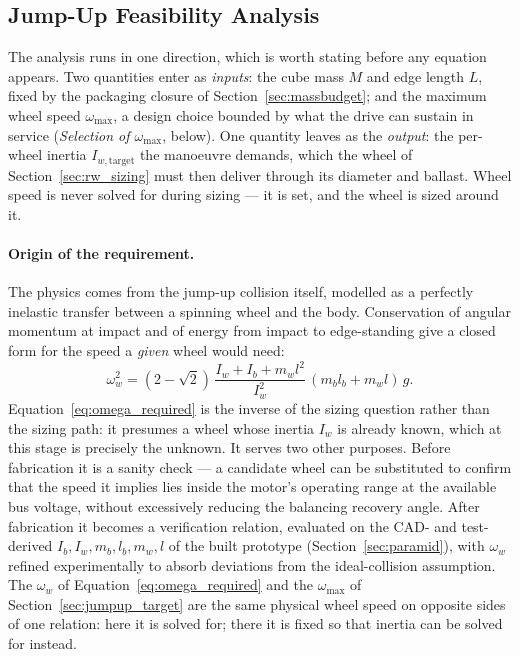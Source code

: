 \subsection{Jump-Up Feasibility Analysis}
\label{sec:jumpup}

The analysis runs in one direction, which is worth stating before any equation
appears. Two quantities enter as \emph{inputs}: the cube mass $M$ and edge
length $L$, fixed by the packaging closure of Section~\ref{sec:massbudget};
and the maximum wheel speed $\omega_{\max}$, a design choice bounded by what
the drive can sustain in service (\emph{Selection of $\omega_{\max}$}, below).
One quantity leaves as the \emph{output}: the per-wheel inertia
$I_{w,\text{target}}$ the manoeuvre demands, which the wheel of
Section~\ref{sec:rw_sizing} must then deliver through its diameter and
ballast. Wheel speed is never solved for during sizing --- it is set, and the
wheel is sized around it.

\paragraph{Origin of the requirement.} The physics comes from the jump-up
collision itself, modelled as a perfectly inelastic transfer between a
spinning wheel and the body. Conservation of angular momentum at impact and of
energy from impact to edge-standing give a closed form for the speed a
\emph{given} wheel would need:
\begin{equation}
\omega_w^2 = (2-\sqrt2)\,\frac{I_w+I_b+m_wl^2}{I_w^2}\,(m_bl_b+m_wl)\,g.
\label{eq:omega_required}
\end{equation}
Equation~\eqref{eq:omega_required} is the inverse of the sizing question
rather than the sizing path: it presumes a wheel whose inertia $I_w$ is
already known, which at this stage is precisely the unknown. It serves two
other purposes. Before fabrication it is a sanity check --- a candidate wheel
can be substituted to confirm that the speed it implies lies inside the
motor's operating range at the available bus voltage, without excessively
reducing the balancing recovery angle. After fabrication it becomes a
verification relation, evaluated on the CAD- and test-derived $I_b, I_w, m_b,
l_b, m_w, l$ of the built prototype (Section~\ref{sec:paramid}), with
$\omega_w$ refined experimentally to absorb deviations from the ideal-collision
assumption. The $\omega_w$ of Equation~\eqref{eq:omega_required} and the
$\omega_{\max}$ of Section~\ref{sec:jumpup_target} are the same physical wheel
speed on opposite sides of one relation: here it is solved for; there it is
fixed so that inertia can be solved for instead.

